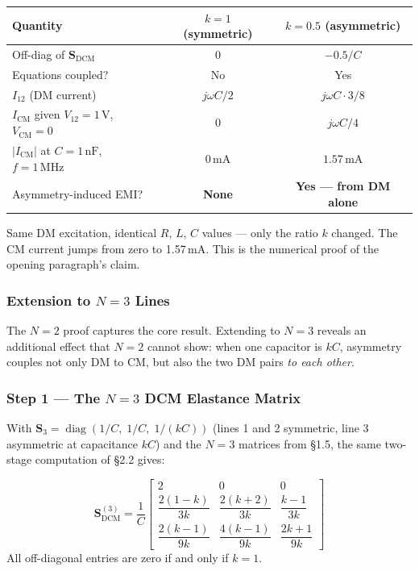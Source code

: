 \begin{statebox}[Side-by-Side Summary: $k = 1$ vs.\ $k = 0.5$]
\begin{center}
\renewcommand{\arraystretch}{1.5}
\begin{tabular}{lcc}
\toprule
\textbf{Quantity}
    & $k = 1$ (symmetric)
    & $k = 0.5$ (asymmetric) \\
\midrule
Off-diag of $\mathbf{S}_{\mathrm{DCM}}$
    & $0$ & $-0.5/C$ \\
Equations coupled?
    & No  & Yes \\
$I_{12}$ (DM current)
    & $j\omega C/2$
    & $j\omega C \cdot 3/8$ \\
$I_{\mathrm{CM}}$ given $V_{12}=1\,\text{V}$, $V_{\mathrm{CM}}=0$
    & $0$
    & $j\omega C/4$ \\
$|I_{\mathrm{CM}}|$ at $C=1\,\text{nF}$, $f = 1\,\text{MHz}$
    & $0\,\text{mA}$
    & $1.57\,\text{mA}$ \\
Asymmetry-induced EMI?
    & \textbf{None}
    & \textbf{Yes — from DM alone} \\
\bottomrule
\end{tabular}
\end{center}
Same DM excitation, identical $R$, $L$, $C$ values — only the
ratio $k$ changed.  The CM current jumps from zero to 1.57\,mA.
This is the numerical proof of the opening paragraph's claim.
\end{statebox}

\subsubsection*{Extension to $N = 3$ Lines}

The $N = 2$ proof captures the core result.  Extending to $N = 3$
reveals an additional effect that $N = 2$ cannot show: when one
capacitor is $kC$, asymmetry couples not only DM to CM, but also
the two DM pairs \emph{to each other}.

\subsubsection*{Step 1 — The $N = 3$ DCM Elastance Matrix}

With $\mathbf{S}_3 = \operatorname{diag}(1/C,\;1/C,\;1/(kC))$
(lines 1 and 2 symmetric, line 3 asymmetric at capacitance $kC$)
and the $N = 3$ matrices from \S1.5, the same two-stage computation
of \S2.2 gives:

\begin{eqnbox}[DCM Elastance Matrix ($N = 3$, general $k$)]
\begin{equation}
\mathbf{S}_{\mathrm{DCM}}^{(3)}
= \frac{1}{C}
\begin{bmatrix}
    2 & 0 & 0 \\[8pt]
    \dfrac{2(1-k)}{3k} & \dfrac{2(k+2)}{3k} & \dfrac{k-1}{3k} \\[12pt]
    \dfrac{2(k-1)}{9k} & \dfrac{4(k-1)}{9k} & \dfrac{2k+1}{9k}
\end{bmatrix}
\label{eq:Sdcm_N3}
\end{equation}
All off-diagonal entries are zero if and only if $k = 1$.
\end{eqnbox}

